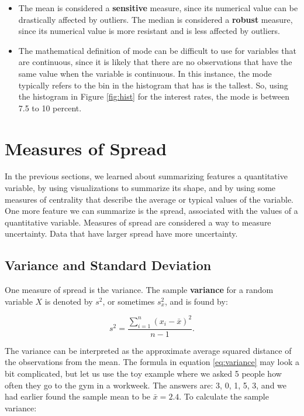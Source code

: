 \documentclass[
]{book}
\begin{document}
\begin{itemize}
\item
  The mean is considered a \textbf{sensitive} measure, since its numerical value can be drastically affected by outliers. The median is considered a \textbf{robust} measure, since its numerical value is more resistant and is less affected by outliers.
\item
  The mathematical definition of mode can be difficult to use for variables that are continuous, since it is likely that there are no observations that have the same value when the variable is continuous. In this instance, the mode typically refers to the bin in the histogram that has is the tallest. So, using the histogram in Figure \ref{fig:hist} for the interest rates, the mode is between 7.5 to 10 percent.
\end{itemize}

\section{Measures of Spread}\label{measures-of-spread}

In the previous sections, we learned about summarizing features a quantitative variable, by using visualizations to summarize its shape, and by using some measures of centrality that describe the average or typical values of the variable. One more feature we can summarize is the spread, associated with the values of a quantitative variable. Measures of spread are considered a way to measure uncertainty. Data that have larger spread have more uncertainty.

\subsection{Variance and Standard Deviation}\label{variance-and-standard-deviation}

One measure of spread is the variance. The sample \textbf{variance} for a random variable \(X\) is denoted by \(s^2\), or sometimes \(s_x^2\), and is found by:

\begin{equation} 
s^2 = \frac{\sum_{i=1}^n (x_i-\bar{x})^2}{n-1}.
\label{eq:variance}
\end{equation}

The variance can be interpreted as the approximate average squared distance of the observations from the mean. The formula in equation \eqref{eq:variance} may look a bit complicated, but let us use the toy example where we asked 5 people how often they go to the gym in a workweek. The answers are: 3, 0, 1, 5, 3, and we had earlier found the sample mean to be \(\bar{x} = 2.4\). To calculate the sample variance:
\end{document}
